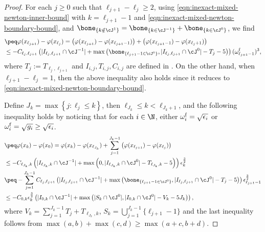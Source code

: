 \begin{proof}
    For each $j \geq 0$ such that $\ell_{j+1} - \ell_j \geq 2$, 
    using \eqref{eqn:inexact-mixed-newton-inner-bound} with $k = \ell_{j+1} - 1$ and \eqref{eqn:inexact-mixed-newton-boundary-bound}, and $\bone_{\{k\notin \cJ^1\}} = \bone_{\{k\in \cJ^{-1}\}} + \bone_{\{k\in \cJ^0\}}$, we find 
    \begin{align*}
        &\peq \varphi(x_{\ell_{j+1}})
        - \varphi(x_{\ell_{j}})  
        = 
        \left (\varphi(x_{\ell_{j+1}}) - \varphi(x_{\ell_{j+1}-1})  \right )
        + \left ( \varphi(x_{\ell_{j+1}-1}) - \varphi(x_{\ell_{j}+1}) \right ) 
        \\
        &\leq 
        - C_{\ell_j,\ell_{j+1}}
        \left ( 
            |I_{\ell_j,\ell_{j+1}} \cap \cJ^{-1} |
            +
            \max\left ( \bone_{\{\ell_{j+1}-1 \in \cJ^{0}\}}, | I_{\ell_j,\ell_{j+1}} \cap \cJ^0 | - T_{j} - 5 \right ) 
        \right )
        (\omega^{\supfallback}_{{\ell_{j+1}-1}})^3,
    \end{align*}
    where $T_j := T_{\ell_j,\ell_{j+1}}$ and $I_{i,j}, T_{i,j}, C_{i,j}$ are defined in .
    On the other hand,
    when $\ell_{j+1} - \ell_j = 1$, then the above inequality also holds since it reduces to \eqref{eqn:inexact-mixed-newton-boundary-bound}.

    Define $J_k = \max\left\{ j : \ell_j \leq k \right\}$,
     then $\ell_{J_k} \leq k < \ell_{J_{k}+1}$, and the following inequality holds by noticing that for each $i \in \N$, either $\omega^{\mathrm{f}}_i = \sqrt{\epsilon_i}$ or $\omega^{\mathrm{f}}_i = \sqrt{g_i} \geq \sqrt{\epsilon_i}$.
    \begin{align}
        \nonumber
        &\peq \varphi(x_k) - \varphi(x_0) 
        = 
        \varphi(x_k) - \varphi(x_{\ell_{J_k}})
        + \sum_{j = 1}^{J_k-1} 
        \left ( \varphi(x_{\ell_{j+1}}) - \varphi(x_{\ell_{j}}) \right ) \\
        \nonumber
        &\leq
        - C_{\ell_{J_k},k}
        \left ( 
            |I_{\ell_{J_k},k} \cap \cJ^{-1} |
            + 
            \max\left ( 0, | I_{\ell_{J_k},k} \cap \cJ^0 | - T_{\ell_{J_k},k} - 5 \right ) 
        \right ) \epsilon_{k}^{\frac{3}{2}} \\
        \nonumber
        &\peq 
        -
        \sum_{j=1}^{J_k-1}
        C_{\ell_j,\ell_{j+1}}
        \left ( 
            |I_{\ell_j,\ell_{j+1}} \cap \cJ^{-1} |
            +
            \max\left ( \bone_{\{\ell_{j+1}-1 \in \cJ^{0}\}}, | I_{\ell_j,\ell_{j+1}} \cap \cJ^0 | - T_{j} - 5 \right ) 
        \right )
        \epsilon_{{\ell_{j+1}-1}}^{\frac{3}{2}}
        \\
        &\leq -C_{0,k} \epsilon_k^{\frac{3}{2}}
        \left (
            |I_{0,k} \cap \cJ^{-1}|
            + \max\left( 
               |S_k \cap \cJ^0|,
                |I_{0,k} \cap \cJ^0| - V_k - 5J_k
                \right)
        \right ),%
    \end{align}
    where $V_k = \sum_{j=1}^{J_k-1} T_j + T_{\ell_{J_k},k}$, $S_k = \bigcup_{j=1}^{J_k-1}\{\ell_{j+1}-1\}$ 
    and the last inequality follows from $\max(a, b) + \max(c, d) \geq \max(a + c, b + d)$.
\end{proof}

